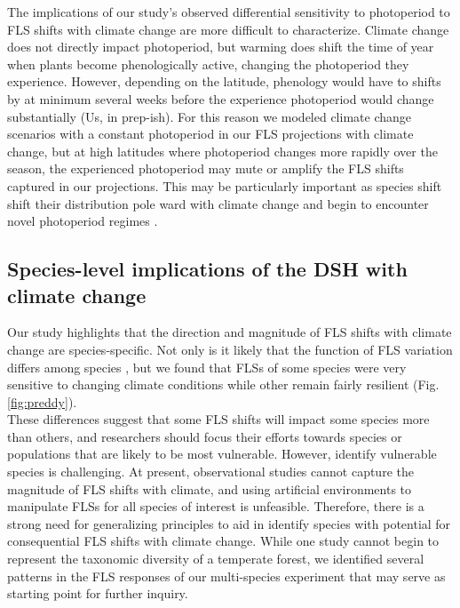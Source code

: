 \documentclass[11pt]{article}\usepackage[]{graphicx}\usepackage[]{color}
\begin{document}
{\noindent The implications of our study's observed differential sensitivity to photoperiod to FLS shifts with climate change are more difficult to characterize.  Climate change does not directly impact photoperiod, but warming does shift the time of year when plants become phenologically active, changing the photoperiod they experience.  However, depending on the latitude, phenology would have to shifts by at minimum several weeks before the experience photoperiod would change substantially \citep{}(Us, in prep-ish). For this reason we modeled climate change scenarios with a constant photoperiod in our FLS projections with climate change, but at high latitudes where photoperiod changes more rapidly over the season, the experienced photoperiod may mute or amplify the FLS shifts captured in our projections. This may be particularly important as species shift shift their distribution pole ward with climate change and begin to encounter novel photoperiod regimes \citep{WAY:2015aa}.\\

\subsection*{Species-level implications of the DSH with climate change}
\noindent  Our study highlights that the direction and magnitude of FLS shifts with climate change are species-specific. Not only is it likely that the function of FLS variation differs among species \citep{Buonaiuto2020}, but we found that FLSs of some species were very sensitive to changing climate conditions while other remain fairly resilient (Fig. \ref{fig:preddy}).\\

\noident These differences suggest that some FLS shifts will impact some species more than others, and researchers should focus their efforts towards species or populations that are likely to be most vulnerable. However, identify vulnerable species is challenging. At present, observational studies cannot capture the magnitude of FLS shifts with climate, and using artificial environments to manipulate FLSs for all species of interest is unfeasible. Therefore, there is a strong need for generalizing principles to aid in identify species with potential for consequential FLS shifts with climate change. While one study cannot begin to represent the taxonomic diversity of a temperate forest, we identified several patterns in the FLS responses of our multi-species experiment that may serve as starting point for further inquiry.\\

}
\end{document}
